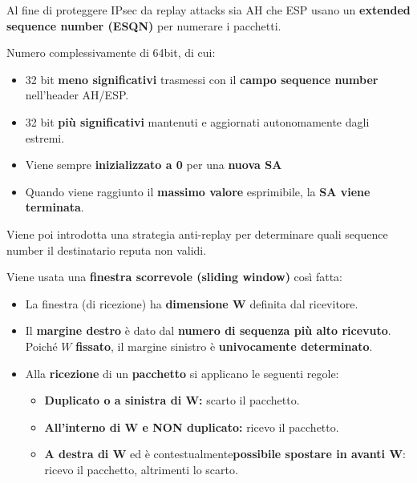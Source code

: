\begin{remark}
Al fine di proteggere IPsec da replay attacks sia AH che ESP usano un \textbf{extended sequence number (ESQN)} per numerare i pacchetti.
\end{remark}
\begin{definition}[ESQN]\label{def:esqn}
Numero complessivamente di 64bit, di cui:
\begin{itemize}
    \item 32 bit \textbf{meno significativi} trasmessi con il \textbf{campo sequence number} nell'header AH/ESP.\footnotemark {}
    \item 32 bit \textbf{più significativi} mantenuti e aggiornati autonomamente dagli estremi.
    \item Viene sempre \textbf{inizializzato a 0} per una \textbf{nuova SA}
    \item Quando viene raggiunto il \textbf{massimo valore} esprimibile, la \textbf{SA viene terminata}.
\end{itemize}
\end{definition}
Viene poi introdotta una strategia anti-replay per determinare quali sequence number il destinatario reputa non validi.
\begin{theorem}\label{thm:antireplay}
Viene usata una \textbf{finestra scorrevole (sliding window)} così fatta:
\begin{itemize}
    \item La finestra (di ricezione) ha \textbf{dimensione W} definita dal ricevitore.
    \item Il \textbf{margine destro} è dato dal \textbf{numero di sequenza più alto ricevuto}. Poiché $W$ \textbf{fissato}, il margine sinistro è \textbf{univocamente determinato}.
    \item Alla \textbf{ricezione} di un \textbf{pacchetto} si applicano le seguenti regole:
    \begin{itemize}
        \item \textbf{Duplicato o a sinistra di W:} scarto il pacchetto.
        \item \textbf{All'interno di W e NON duplicato:} ricevo il pacchetto.
        \item \textbf{A destra di W} ed è contestualmente\footnotemark \textbf{possibile spostare in avanti W}: ricevo il pacchetto, altrimenti lo scarto.
    \end{itemize}
\end{itemize}

\end{theorem}
